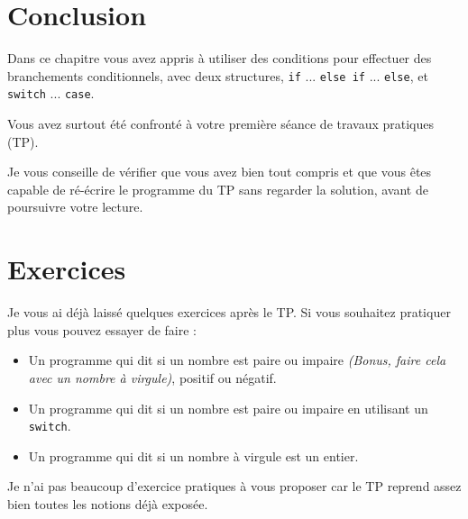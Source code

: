 \section*{Conclusion}
{}
Dans ce chapitre vous avez appris à utiliser des conditions pour effectuer des branchements conditionnels, avec deux structures, \texttt{if} ... \texttt{else if} ... \texttt{else}, et \texttt{switch} ... \texttt{case}.

Vous avez surtout été confronté à votre première séance de travaux pratiques (TP).

Je vous conseille de vérifier que vous avez bien tout compris et que vous êtes capable de ré-écrire le programme du TP sans regarder la solution, avant de poursuivre votre lecture.

\section*{Exercices}
{}
Je vous ai déjà laissé quelques exercices après le TP.
Si vous souhaitez pratiquer plus vous pouvez essayer de faire :
\begin{itemize}
\item Un programme qui dit si un nombre est paire ou impaire
\emph{(Bonus, faire cela avec un nombre à virgule)}, positif ou négatif.
\item Un programme qui dit si un nombre est paire ou impaire en utilisant un \texttt{switch}.
\item Un programme qui dit si un nombre à virgule est un entier.
\end{itemize}

Je n'ai pas beaucoup d'exercice pratiques à vous proposer car le TP reprend assez bien toutes les notions déjà exposée.

